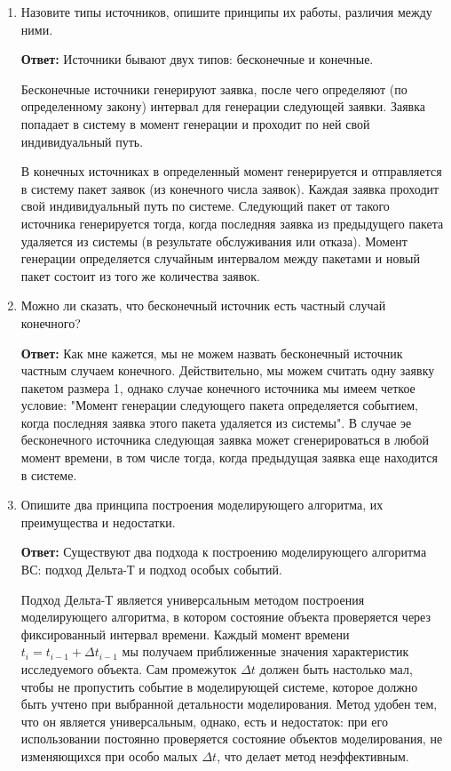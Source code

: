 \documentclass{article}
\begin{document}
	\begin{enumerate}
		\item Назовите типы источников, опишите принципы их работы, различия между ними.

		\textbf{Ответ:} Источники бывают двух типов: бесконечные и конечные.

		Бесконечные источники генерируют заявка, после чего определяют (по определенному закону) интервал для генерации следующей заявки. Заявка попадает в систему в момент генерации и проходит по ней свой индивидуальный путь.

		В конечных источниках в определенный момент генерируется и отправляется в систему пакет заявок (из конечного числа заявок). Каждая заявка проходит свой индивидуальный путь по системе. Следующий пакет от такого источника генерируется тогда, когда последняя заявка из предыдущего пакета удаляется из системы (в результате обслуживания или отказа). Момент генерации определяется случайным интервалом между пакетами и новый пакет состоит из того же количества заявок.
		\item Можно ли сказать, что бесконечный источник есть частный случай конечного?

		\textbf{Ответ:} Как мне кажется, мы не можем назвать бесконечный источник частным случаем конечного. Действительно, мы можем считать одну заявку пакетом размера 1, однако случае конечного источника мы имеем четкое условие: "Момент генерации следующего пакета определяется событием, когда последняя заявка этого пакета удаляется из системы". В случае эе бесконечного источника следующая заявка может сгенерироваться в любой момент времени, в том числе тогда, когда предыдущая заявка еще находится в системе.
		\item Опишите два принципа построения моделирующего алгоритма, их преимущества и недостатки.

		\textbf{Ответ:} Существуют два подхода к построению моделирующего алгоритма ВС: подход Дельта-Т и подход особых событий.

		Подход Дельта-Т является универсальным методом построения моделирующего алгоритма, в котором состояние объекта проверяется через фиксированный интервал времени. Каждый момент времени $t_i=t_{i-1}+\Delta{t_{i-1}}$ мы получаем приближенные значения характеристик исследуемого объекта. Сам промежуток $\Delta{t}$ должен быть настолько мал, чтобы не пропустить событие в моделирующей системе, которое должно быть учтено при выбранной детальности моделирования. Метод удобен тем, что он является универсальным, однако, есть и недостаток: при его использовании постоянно проверяется состояние объектов моделирования, не изменяющихся при особо малых $\Delta{t}$, что делает метод неэффективным.


\end{enumerate}
\end{document}
